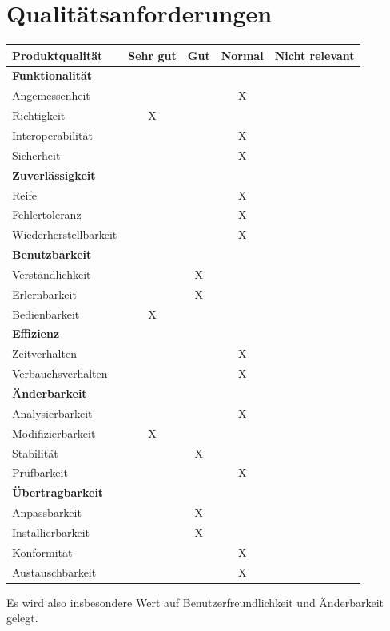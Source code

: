 \documentclass[parskip=full]{scrartcl}
\begin{document}
\section{Qualitätsanforderungen}
 \begin{tabular}{l||c|c|c|c} 
  Produktqualität & Sehr gut & Gut & Normal & Nicht relevant \\
  \hline
  \hline
  \textbf{Funktionalität} & &&&\\
  Angemessenheit & & & X &  \\
  Richtigkeit & X & & & \\
  Interoperabilität & & & X &\\
  Sicherheit & & & X & \\
  \hline
  \textbf{Zuverlässigkeit} &&&&\\
  Reife & & & X & \\
  Fehlertoleranz & & & X & \\
  Wiederherstellbarkeit & & & X &\\
  \hline
  \textbf{Benutzbarkeit} &&&&\\
  Verständlichkeit & & X & &\\
  Erlernbarkeit & & X & &\\
  Bedienbarkeit & X & & &\\
  \hline
  \textbf{Effizienz} &&&&\\
  Zeitverhalten & & & X & \\
  Verbauchsverhalten & & & X & \\
  \hline
  \textbf{Änderbarkeit} &&&&\\
  Analysierbarkeit & & & X &\\
  Modifizierbarkeit & X & & &\\
  Stabilität & & X&  &\\
  Prüfbarkeit & & & X &\\
  \hline
  \textbf{Übertragbarkeit} &&&&\\
  Anpassbarkeit & & X & &\\
  Installierbarkeit & & X & & \\
  Konformität & & & X & \\
  Austauschbarkeit & & & X & \\
 \end{tabular}
 
 Es wird also insbesondere Wert auf Benutzerfreundlichkeit und Änderbarkeit gelegt.
 


\newpage
\end{document}
